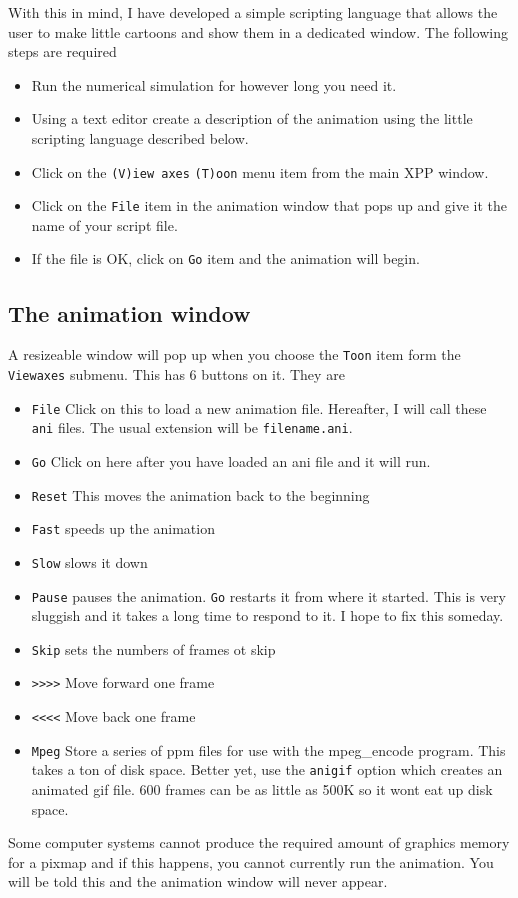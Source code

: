 \documentclass{article}
\begin{document}
With this in mind, I have developed a simple scripting language that
allows the user to make little cartoons and show them in a dedicated
window.  The following steps are required
\begin{itemize}
\item Run the numerical simulation for however long you need it.
\item  Using a text editor create a description of the animation using
the little scripting language described below.
\item Click on the {\tt (V)iew axes} {\tt (T)oon} menu item from the
main XPP window.
\item Click on the {\tt File} item in the animation window that pops
up and give it the name of your script file.
\item If the file is OK, click on {\tt Go} item and the animation will
begin.
\end{itemize}

\subsection{The animation window}
A resizeable window will pop up when you choose the {\tt Toon} item
form the {\tt Viewaxes} submenu. This has 6 buttons on it. They are
\begin{itemize}
\item {\tt File} Click on this to load a new animation
file. Hereafter, I will call these {\tt ani} files. The usual
extension will be {\tt filename.ani}.
\item {\tt Go} Click on here after you have loaded an ani file and it
will run.
\item {\tt Reset} This moves the animation back to the beginning
\item {\tt Fast} speeds up the animation
\item {\tt Slow} slows it down
\item {\tt Pause} pauses the animation. {\tt Go} restarts it from
where it started. This is very sluggish and it takes a long time to
respond to it. I hope to fix this someday.
\item{\tt Skip} sets the numbers of frames ot skip
\item{\tt >>>>} Move forward one frame
\item{\tt <<<<} Move back one frame
\item{\tt Mpeg} Store a series of ppm files for use with the
mpeg\_encode program. This takes a ton of disk space.  Better yet, use
the {\tt anigif} option which creates an animated gif file.  600
frames can be as little as 500K so it wont eat up disk space.
\end{itemize}
Some computer systems cannot produce the required amount of graphics
memory for a pixmap and if this happens, you cannot currently run the
animation. You will be told this and the animation window will never
appear.
\end{document}
